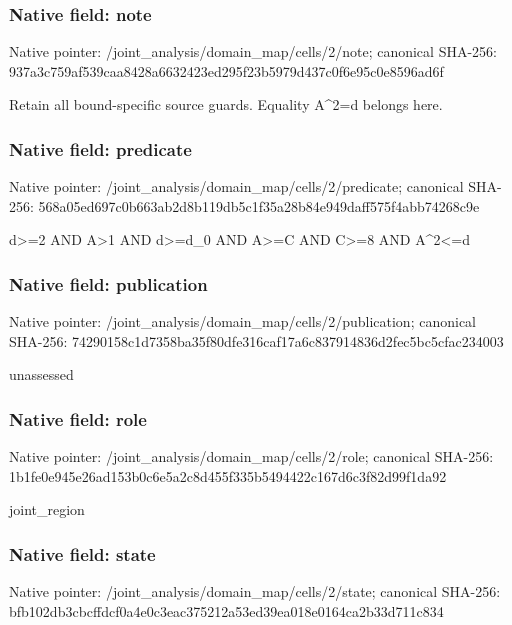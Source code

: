 \documentclass[10pt,a4paper]{article}
\begin{document}
\subsubsection{Native field: note}
Native pointer: /joint\_\allowbreak{}analysis/domain\_\allowbreak{}map/cells/2/note; canonical SHA-256: 937a3c759af539caa8428a6632423ed295f23b5979d437c0f6e95c0e8596ad6f

\begingroup\raggedright\sloppy Retain all bound-specific source guards. Equality A\textasciicircum{}2=\allowbreak{}d belongs here.\par\endgroup

\subsubsection{Native field: predicate}
Native pointer: /joint\_\allowbreak{}analysis/domain\_\allowbreak{}map/cells/2/predicate; canonical SHA-256: 568a05ed697c0b663ab2d8b119db5c1f35a28b84e949daff575f4abb74268c9e

\begingroup\raggedright\sloppy d>=\allowbreak{}2 AND A>1 AND d>=\allowbreak{}d\_\allowbreak{}0 AND A>=\allowbreak{}C AND C>=\allowbreak{}8 AND A\textasciicircum{}2<=\allowbreak{}d\par\endgroup

\subsubsection{Native field: publication}
Native pointer: /joint\_\allowbreak{}analysis/domain\_\allowbreak{}map/cells/2/publication; canonical SHA-256: 74290158c1d7358ba35f80dfe316caf17a6c837914836d2fec5bc5cfac234003

\begingroup\raggedright\sloppy unassessed\par\endgroup

\subsubsection{Native field: role}
Native pointer: /joint\_\allowbreak{}analysis/domain\_\allowbreak{}map/cells/2/role; canonical SHA-256: 1b1fe0e945e26ad153b0c6e5a2c8d455f335b5494422c167d6c3f82d99f1da92

\begingroup\raggedright\sloppy joint\_\allowbreak{}region\par\endgroup

\subsubsection{Native field: state}
Native pointer: /joint\_\allowbreak{}analysis/domain\_\allowbreak{}map/cells/2/state; canonical SHA-256: bfb102db3cbcffdcf0a4e0c3eac375212a53ed39ea018e0164ca2b33d711c834
\end{document}
